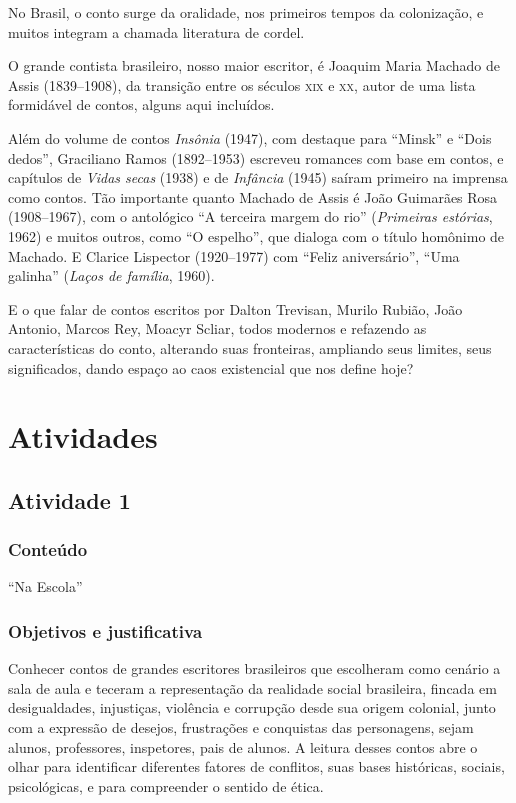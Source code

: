 No Brasil, o conto surge da oralidade, nos primeiros tempos da
colonização, e muitos integram a chamada literatura de cordel.

O grande contista brasileiro, nosso maior escritor, é Joaquim Maria
Machado de Assis (1839--1908), da transição entre os séculos \textsc{xix} e \textsc{xx},
autor de uma lista formidável de contos, alguns aqui incluídos.

Além do volume de contos \emph{Insônia} (1947), com destaque para
``Minsk'' e ``Dois dedos'', Graciliano Ramos (1892--1953) escreveu
romances com base em contos, e capítulos de \emph{Vidas secas} (1938) e
de \emph{Infância} (1945) saíram primeiro na imprensa como contos. Tão
importante quanto Machado de Assis é João Guimarães Rosa (1908--1967),
com o antológico ``A terceira margem do rio'' (\emph{Primeiras
estórias}, 1962) e muitos outros, como ``O espelho'', que dialoga com o
título homônimo de Machado. E Clarice Lispector (1920--1977) com ``Feliz
aniversário'', ``Uma galinha'' (\emph{Laços de família}, 1960).

E o que falar de contos escritos por Dalton Trevisan, Murilo Rubião,
João Antonio, Marcos Rey, Moacyr Scliar, todos modernos e refazendo as
características do conto, alterando suas fronteiras, ampliando seus
limites, seus significados, dando espaço ao caos existencial que nos
define hoje?

\chapter{Atividades}

\section{Atividade 1}

\subsection{Conteúdo}

``Na Escola''

\subsection{Objetivos e justificativa}

Conhecer contos de grandes escritores brasileiros que escolheram como
cenário a sala de aula e teceram a representação da realidade social
brasileira, fincada em desigualdades, injustiças, violência e corrupção
desde sua origem colonial, junto com a expressão de desejos, frustrações
e conquistas das personagens, sejam alunos, professores, inspetores,
pais de alunos. A leitura desses contos abre o olhar para identificar
diferentes fatores de conflitos, suas bases históricas, sociais,
psicológicas, e para compreender o sentido de ética.

